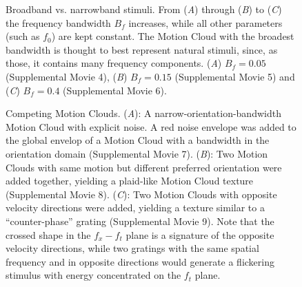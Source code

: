 \documentclass[a4paper,11pt]{article}%
\begin{document}
\newpage %
\begin{figure}%
	 \caption{Broadband vs. narrowband stimuli. From (\textit{A}) through (\textit{B}) to (\textit{C}) the frequency bandwidth $B_{f}$ increases, while all other parameters (such as $f_{0}$) are kept constant. The Motion Cloud with the broadest bandwidth is thought to best represent natural stimuli, since, as those, it contains many frequency components. (\textit{A}) $B_{f}=0.05$ (Supplemental Movie 4), (\textit{B}) $B_{f}=0.15$ (Supplemental Movie 5) and (\textit{C}) $B_{f}=0.4$ (Supplemental Movie 6).} 
	 \label{fig:broadbandstimuli}
\end{figure}
\newpage %
\begin{figure}%
	 \caption{Competing Motion Clouds. (\textit{A}): A narrow-orientation-bandwidth Motion Cloud with explicit noise. A red noise envelope was added to the global envelop of a Motion Cloud with a bandwidth in the orientation domain (Supplemental Movie  7). (\textit{B}): Two Motion Clouds with same motion but different preferred orientation were added together, yielding a plaid-like Motion Cloud texture (Supplemental Movie 8). (\textit{C}): Two Motion Clouds with opposite velocity directions were added, yielding a texture similar to a ``counter-phase'' grating (Supplemental Movie 9). Note that the crossed shape in the $f_x-f_t$ plane is a signature of the opposite velocity directions, while two gratings with the same spatial frequency and in opposite directions would generate a flickering stimulus with energy concentrated on the $f_t$ plane.} %
	 \label{fig:counterphase} %
\end{figure} %
\end{document}
